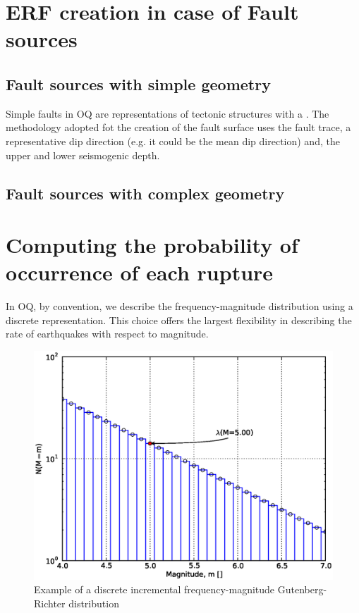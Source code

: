 %
\section{ERF creation in case of Fault sources}

%
\subsection{Fault sources with simple geometry}
Simple faults in OQ are representations of tectonic structures with a . The methodology adopted fot the creation of the fault surface uses the fault trace, a representative dip direction (e.g. it could be the mean dip direction) and, the upper and lower seismogenic depth. 

%
\subsection{Fault sources with complex geometry}

%
\section{Computing the probability of occurrence of each rupture}
In OQ, by convention, we describe the frequency-magnitude distribution using a discrete representation. This choice offers the largest flexibility in describing the rate of earthquakes with respect to magnitude. 
%
\begin{figure}[!ht]
\includegraphics[width=15cm]{./Figures/Part_Hazard/gr_example.eps}
\caption{Example of a discrete incremental frequency-magnitude Gutenberg-Richter distribution}
\label{fig:gr-example}
\end{figure}
%


